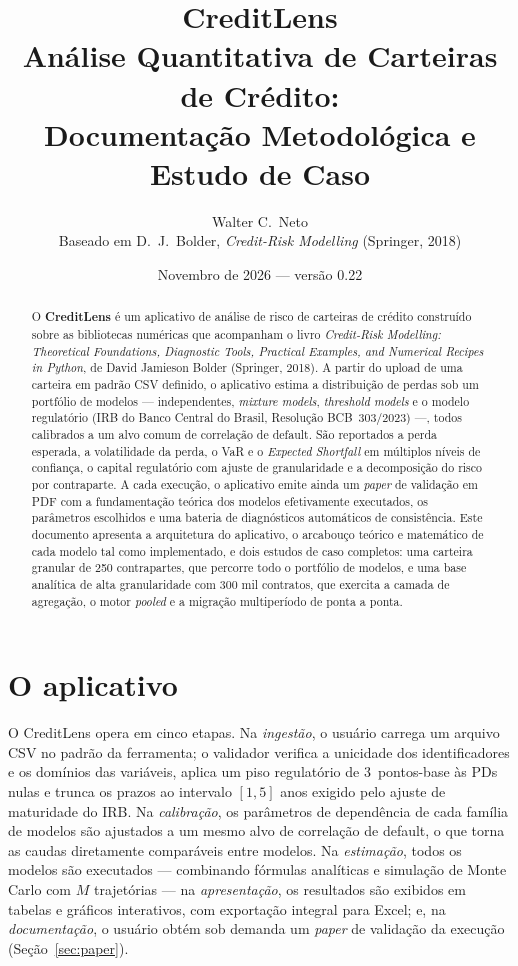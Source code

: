 \documentclass[11pt,a4paper]{article}
\title{\textbf{CreditLens}\\[2mm]
\large Análise Quantitativa de Carteiras de Crédito:\\
Documentação Metodológica e Estudo de Caso}
\author{Walter C.~Neto\\[1mm]\small Baseado em D.~J.~Bolder, \emph{Credit-Risk Modelling} (Springer, 2018)}
\date{Novembro de 2026 --- versão 0.22}
\begin{document}
\maketitle

\begin{abstract}
\noindent O \textbf{CreditLens} é um aplicativo de análise de risco de carteiras de crédito construído sobre as bibliotecas numéricas que acompanham o livro \emph{Credit-Risk Modelling: Theoretical Foundations, Diagnostic Tools, Practical Examples, and Numerical Recipes in Python}, de David Jamieson Bolder (Springer, 2018). A partir do upload de uma carteira em padrão CSV definido, o aplicativo estima a distribuição de perdas sob um portfólio de modelos --- independentes, \emph{mixture models}, \emph{threshold models} e o modelo regulatório (IRB do Banco Central do Brasil, Resolução BCB~303/2023) ---, todos calibrados a um alvo comum de correlação de default. São reportados a perda esperada, a volatilidade da perda, o VaR e o \emph{Expected Shortfall} em múltiplos níveis de confiança, o capital regulatório com ajuste de granularidade e a decomposição do risco por contraparte. A cada execução, o aplicativo emite ainda um \emph{paper} de validação em PDF com a fundamentação teórica dos modelos efetivamente executados, os parâmetros escolhidos e uma bateria de diagnósticos automáticos de consistência. Este documento apresenta a arquitetura do aplicativo, o arcabouço teórico e matemático de cada modelo tal como implementado, e dois estudos de caso completos: uma carteira granular de 250 contrapartes, que percorre todo o portfólio de modelos, e uma base analítica de alta granularidade com 300 mil contratos, que exercita a camada de agregação, o motor \emph{pooled} e a migração multiperíodo de ponta a ponta.
\end{abstract}

\tableofcontents

\section{O aplicativo}

O CreditLens opera em cinco etapas. Na \emph{ingestão}, o usuário carrega um arquivo CSV no padrão da ferramenta; o validador verifica a unicidade dos identificadores e os domínios das variáveis, aplica um piso regulatório de 3~pontos-base às PDs nulas e trunca os prazos ao intervalo $[1,5]$ anos exigido pelo ajuste de maturidade do IRB. Na \emph{calibração}, os parâmetros de dependência de cada família de modelos são ajustados a um mesmo alvo de correlação de default, o que torna as caudas diretamente comparáveis entre modelos. Na \emph{estimação}, todos os modelos são executados --- combinando fórmulas analíticas e simulação de Monte Carlo com $M$ trajetórias --- na \emph{apresentação}, os resultados são exibidos em tabelas e gráficos interativos, com exportação integral para Excel; e, na \emph{documentação}, o usuário obtém sob demanda um \emph{paper} de validação da execução (Seção~\ref{sec:paper}).
\end{document}
